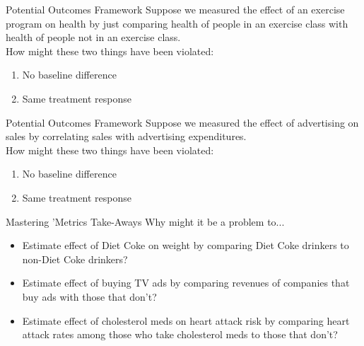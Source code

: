 \documentclass[11pt]{beamer}
\begin{document}
\begin{frame}[c]{Potential Outcomes Framework}
Suppose we measured the effect of an exercise program on health by just comparing health of people in an exercise class with health of people not in an exercise class. \\
How might these two things have been violated:
\begin{enumerate}
  \item No baseline difference
  \item Same treatment response
\end{enumerate}
\end{frame}


\begin{frame}[c]{Potential Outcomes Framework}
Suppose we measured the effect of advertising on sales by correlating sales with advertising expenditures. \\

How might these two things have been violated:
  \begin{enumerate}
    \item No baseline difference
    \item Same treatment response
  \end{enumerate}
\end{frame}



\begin{frame}[c]{Mastering 'Metrics Take-Aways}
Why might it be a problem to...
\begin{itemize}
  \pause \item Estimate effect of Diet Coke on weight by comparing Diet Coke drinkers to non-Diet Coke drinkers?
  \pause \item Estimate effect of buying TV ads by comparing revenues of companies that buy ads with those that don't?
  \pause \item Estimate effect of cholesterol meds on heart attack risk by comparing heart attack rates among those who take cholesterol meds to those that don't?
\end{itemize}
\end{frame}
\end{document}
